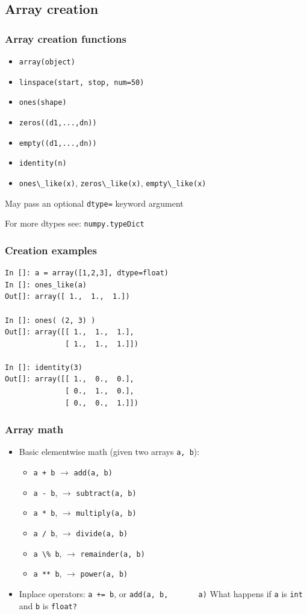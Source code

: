 \documentclass[14pt,compress]{beamer}
\newcounter{time}
\newcommand{\inctime}[1]{\addtocounter{time}{#1}{\tiny \thetime\ m}}
\newcommand{\typ}[1]{\lstinline{#1}}
\begin{document}
\subsection{Array creation}

\begin{frame}[fragile]
  \frametitle{Array creation functions}
  \begin{itemize}
  \item \typ{array(object)}
  \item \typ{linspace(start, stop, num=50)}
  \item \typ{ones(shape)}
  \item \typ{zeros((d1,...,dn))}
  \item \typ{empty((d1,...,dn))}
  \item \typ{identity(n)}
  \item \typ{ones\_like(x)}, \typ{zeros\_like(x)}, \typ{empty\_like(x)}
  \end{itemize}
  May pass an optional \typ{dtype=} keyword argument

  For more dtypes see: \typ{numpy.typeDict}

\end{frame}

\begin{frame}[fragile]
  \frametitle{Creation examples}
  \vspace*{-0.25in}
\begin{lstlisting}
In []: a = array([1,2,3], dtype=float)
In []: ones_like(a)
Out[]: array([ 1.,  1.,  1.])

In []: ones( (2, 3) )
Out[]: array([[ 1.,  1.,  1.],
              [ 1.,  1.,  1.]])

In []: identity(3)
Out[]: array([[ 1.,  0.,  0.],
              [ 0.,  1.,  0.],
              [ 0.,  0.,  1.]])
\end{lstlisting}
  \inctime{15}
\end{frame}

\begin{frame}[fragile]
  \frametitle{Array math}
  \begin{itemize}
  \item Basic \alert{elementwise} math (given two arrays \typ{a, b}):
    \begin{itemize}
        \item \typ{a + b} $\rightarrow$ \typ{add(a, b)}
        \item \typ{a - b}, $\rightarrow$ \typ{subtract(a, b)}
        \item \typ{a * b}, $\rightarrow$ \typ{multiply(a, b)}
        \item \typ{a / b}, $\rightarrow$ \typ{divide(a, b)}
        \item \typ{a \% b}, $\rightarrow$ \typ{remainder(a, b)}
        \item \typ{a ** b}, $\rightarrow$ \typ{power(a, b)}
    \end{itemize}
  \item Inplace operators: \typ{a += b}, or \typ{add(a, b,
      a)}
    \alert{What happens if \typ{a} is \typ{int} and \typ{b} is \typ{float?}}
  \end{itemize}
\end{frame}
\end{document}
